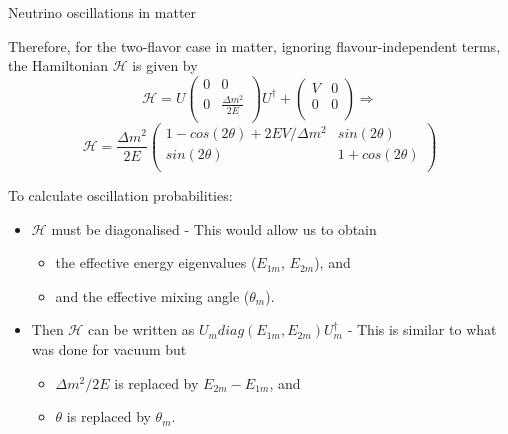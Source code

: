 %
%
%

\begin{frame}{Neutrino oscillations in matter}

Therefore, for the two-flavor case in matter,
ignoring flavour-independent terms,
the Hamiltonian $\mathcal{H}$ is given by
\begin{equation}
     \nonumber
     \mathcal{H}
     =
     U
     \begin{pmatrix}
       0 & 0 \\
       0 & \frac{\Delta m^2}{2E} \\
     \end{pmatrix}
     U^{\dagger} +
     \begin{pmatrix}
       V & 0 \\
       0 & 0 \\
     \end{pmatrix}
     \Rightarrow
\end{equation}
\begin{equation}
     \nonumber
     \mathcal{H}
     =
     \frac{\Delta m^2}{2E}
     \begin{pmatrix}
       1-cos(2\theta) + 2EV/\Delta m^2  & sin(2\theta) \\
       sin(2\theta)                     & 1 + cos(2\theta) \\
     \end{pmatrix}
\end{equation}

To calculate oscillation probabilities:
\begin{itemize}
\item
{\color{magenta} $\mathcal{H}$ must be diagonalised} -
This would allow us to obtain
  \begin{itemize}
  \item
     the effective energy eigenvalues ($E_{1m}$, $E_{2m}$), and
  \item
     and the effective mixing angle ($\theta_m$).
  \end{itemize}
  \item
  Then $\mathcal{H}$ can be written as $U_m diag(E_{1m},E_{2m}) U_m^{\dagger}$ -
  This is similar to what was done for vacuum but
  \begin{itemize}
  \item
     $\Delta m^{2}/2E$ is replaced by $E_{2m}-E_{1m}$, and
  \item
     $\theta$ is replaced by $\theta_m$.
  \end{itemize}

\end{itemize}

\end{frame}

